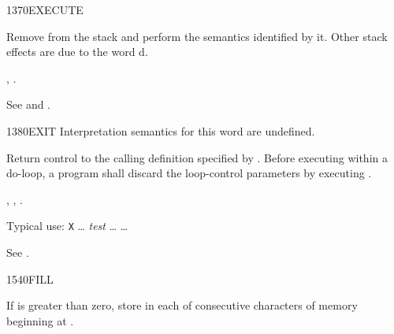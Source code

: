 \begin{worddef}{1370}{EXECUTE}
\item {}

	Remove  from the stack and perform the semantics
	identified by it. Other stack effects are due to the word
	d.

\see {},
	.

	\begin{testing} %
		See  and .
	\end{testing}
\end{worddef}


\begin{worddef}{1380}{EXIT}
\interpret
	Interpretation semantics for this word are undefined.

\execute
	\stack{}{}

	Return control to the calling definition specified by
	. Before executing  within a
	do-loop, a program shall discard the loop-control parameters
	by executing .

\see {},
	,
	.

	\begin{rationale} %
		Typical use:
			\word{:} \texttt{X} {\ldots}
				\emph{test} 
				{\ldots}  
			{\ldots} \word{;}
	\end{rationale}

	\begin{testing} %
		See .
	\end{testing}
\end{worddef}


\begin{worddef}{1540}{FILL}
\item {}

	If  is greater than zero, store  in each of
	 consecutive characters of memory beginning at
	.

	\begin{testing} %
		 \\

		 \\

		 \\
	\end{testing}
\end{worddef}


